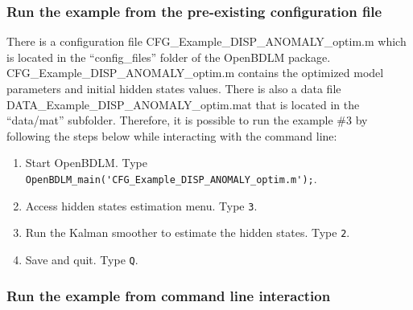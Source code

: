 \subsubsection{Run the example from the pre-existing configuration file}
\label{SS:LoadConfigFileEx3}

There is a configuration file CFG\_Example\_DISP\_ANOMALY\_optim.m which is located in the ``config\_files'' folder of the OpenBDLM package.
CFG\_Example\_DISP\_ANOMALY\_optim.m contains the optimized model parameters and initial hidden states values.
There is also a data file DATA\_Example\_DISP\_ANOMALY\_optim.mat that is located in the ``data/mat'' subfolder.
Therefore, it is possible to run the example \#3 by following the steps below while interacting with the \MATLAB{} command line:
\begin{enumerate}
\item Start OpenBDLM. Type \colorbox{light-gray}{\lstinline[basicstyle = \mlttfamily \small, backgroundcolor = \color{light-gray}]!OpenBDLM_main('CFG_Example_DISP_ANOMALY_optim.m');!}.
\item Access hidden states estimation menu. Type \colorbox{light-gray}{\lstinline[basicstyle = \mlttfamily \small, backgroundcolor = \color{light-gray}]!3!}.
\item Run the Kalman smoother to estimate the hidden states. Type \colorbox{light-gray}{\lstinline[basicstyle = \mlttfamily \small, backgroundcolor = \color{light-gray}]!2!}.
\item Save and quit. Type \colorbox{light-gray}{\lstinline[basicstyle = \mlttfamily \small, backgroundcolor = \color{light-gray}]!Q!}.
\end{enumerate}


\subsubsection{Run the example from command line interaction}

